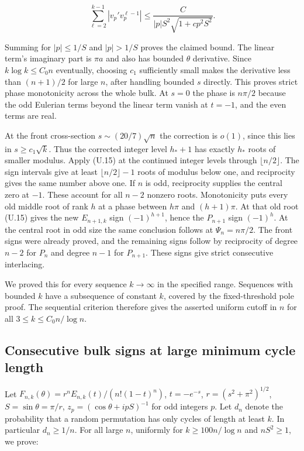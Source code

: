 \documentclass[11pt]{article}
\begin{document}
\[
\sum_{\ell=2}^{k-1}|v_p'v_p^{\ell-1}|
\le \frac{C}{|p|S^2\sqrt{1+c p^2S^2}} .
\]

Summing for $|p|\le1/S$ and $|p|>1/S$ proves the claimed bound. The linear term's imaginary part is $\pi a$ and also has bounded $\theta$ derivative. Since $k\log k\le C_0 n$ eventually, choosing $c_1$ sufficiently small makes the derivative less than $(n+1)/2$ for large $n$, after handling bounded $s$ directly. This proves strict phase monotonicity across the whole bulk. At $s=0$ the phase is $n\pi/2$ because the odd Eulerian terms beyond the linear term vanish at $t=-1$, and the even terms are real.

At the front cross-section $s\sim(20/7)\sqrt n$ the correction is $o(1)$, since this lies in $s\ge c_1\sqrt k$. Thus the corrected integer level $h_*+1$ has exactly $h_*$ roots of smaller modulus. Apply (U.15) at the continued integer levels through $\lfloor n/2\rfloor$. The sign intervals give at least $\lfloor n/2\rfloor-1$ roots of modulus below one, and reciprocity gives the same number above one. If $n$ is odd, reciprocity supplies the central zero at $-1$. These account for all $n-2$ nonzero roots. Monotonicity puts every old middle root of rank $h$ at a phase between $h\pi$ and $(h+1)\pi$. At that old root (U.15) gives the new $E_{n+1,k}$ sign $(-1)^{h+1}$, hence the $P_{n+1}$ sign $(-1)^h$. At the central root in odd size the same conclusion follows at $\Psi_n=n\pi/2$. The front signs were already proved, and the remaining signs follow by reciprocity of degree $n-2$ for $P_n$ and degree $n-1$ for $P_{n+1}$. These signs give strict consecutive interlacing.

We proved this for every sequence $k\to\infty$ in the specified range. Sequences with bounded $k$ have a subsequence of constant $k$, covered by the fixed-threshold pole proof. The sequential criterion therefore gives the asserted uniform cutoff in $n$ for all $3\le k\le C_0 n/\log n$.

\subsection{Consecutive bulk signs at large minimum cycle length}

Let $F_{n,k}(\theta)=r^n E_{n,k}(t)/(n!(1-t)^n)$, $t=-e^{-s}$, $r=(s^2+\pi^2)^{1/2}$, $S=\sin\theta=\pi/r$, $z_p=(\cos\theta+ipS)^{-1}$ for odd integers $p$. Let $d_n$ denote the probability that a random permutation has only cycles of length at least $k$. In particular $d_n\ge1/n$. For all large $n$, uniformly for $k\ge 100 n/\log n$ and $nS^2\ge1$, we prove:
\end{document}

